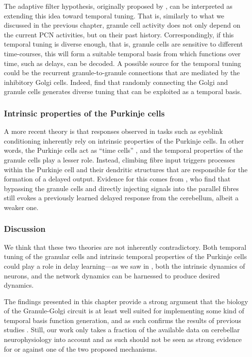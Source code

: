 The adaptive filter hypothesis, originally proposed by \citet{fujita1982adaptive}, can be interpreted as extending this idea toward temporal tuning.
That is, similarly to what we discussed in the previous chapter,
granule cell activity does not only depend on the current PCN activities, but on their past history.
Correspondingly, if this temporal tuning is diverse enough, that is, granule cells are sensitive to different time-courses, this will form a suitable temporal basis from which functions over time, such as delays, can be decoded.
A possible source for the temporal tuning could be the recurrent granule-to-granule connections that are mediated by the inhibitory Golgi cells.
Indeed, \citet{rossert2015edge} find that randomly connecting the Golgi and granule cells generates diverse tuning that can be exploited as a temporal basis.


\subsubsection{Intrinsic properties of the Purkinje cells}
A more recent theory is that responses observed in tasks such as eyeblink conditioning inherently rely on intrinsic properties of the Purkinje cells.
In other words, the Purkinje cells act as \enquote{time cells} \citep{lusk2016cerebellar}, and the temporal properties of the granule cells play a lesser role.
Instead, climbing fibre input triggers processes within the Purkinje cell and their dendritic structures that are responsible for the formation of a delayed output.
Evidence for this comes from \citet{johansson2014memory}, who find that bypassing the granule cells and directly injecting signals into the parallel fibres still evokes a previously learned delayed response from the cerebellum, albeit a weaker one.


\subsubsection{Discussion}
We think that these two theories are not inherently contradictory.
Both temporal tuning of the granular cells and intrinsic temporal properties of the Purkinje cells could play a role in delay learning---as we saw in , both the intrinsic dynamics of neurons, and the network dynamics can be harnessed to produce desired dynamics.

The findings presented in this chapter provide a strong argument that the biology of the Granule-Golgi circuit is at least well suited for implementing some kind of temporal basis function generation, and as such confirms the results of previous studies  \citep[cf.][]{dean2010cerebellar,rossert2015edge}.
Still, our work only takes a fraction of the available data on cerebellar neurophysiology into account and as such should not be seen as strong evidence for or against one of the two proposed mechanisms.
